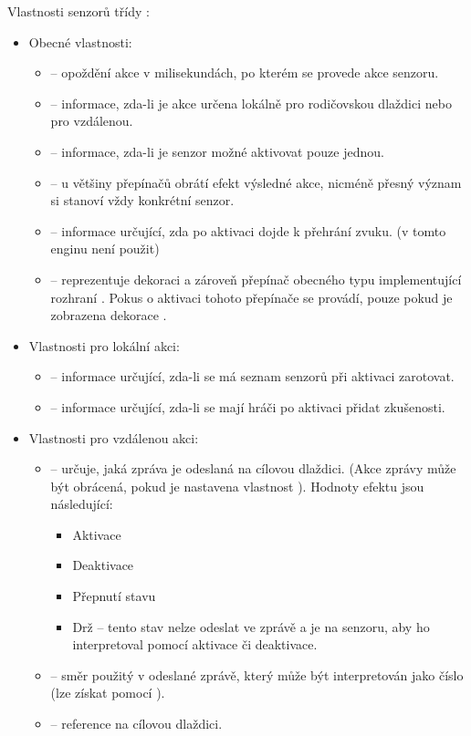 Vlastnosti senzorů třídy :
\begin{itemize}
\item Obecné vlastnosti:
	\begin{itemize}
	\item {} -- opoždění akce v milisekundách, po kterém se provede akce senzoru.
	\item {} -- informace, zda-li je akce určena lokálně pro rodičovskou dlaždici nebo pro vzdálenou.
	\item {} -- informace, zda-li je senzor možné aktivovat pouze jednou.
	\item {} -- u většiny přepínačů obrátí efekt výsledné akce, nicméně přesný význam si stanoví vždy konkrétní senzor. 
	\item {} -- informace určující, zda po aktivaci dojde k přehrání zvuku.  (v tomto enginu není použit)
	\item {} -- reprezentuje dekoraci a zároveň přepínač obecného typu implementující rozhraní .
			Pokus o aktivaci tohoto přepínače se provádí, pouze pokud je zobrazena dekorace .
	\end{itemize}

\item Vlastnosti pro lokální akci:
	\begin{itemize}
	\item {} -- informace určující, zda-li se má seznam senzorů při aktivaci zarotovat.
	\item {} -- informace určující, zda-li se mají hráči po aktivaci přidat zkušenosti.
	\end{itemize}

\item Vlastnosti pro vzdálenou akci:
	\begin{itemize}
	\item {} -- určuje, jaká zpráva je odeslaná na cílovou dlaždici.  (Akce zprávy může být obrácená, pokud je nastavena vlastnost ).
	Hodnoty efektu jsou následující:
		\begin{itemize}
		\item Aktivace 
		\item Deaktivace
		\item Přepnutí stavu
		\item Drž -- tento stav nelze odeslat ve zprávě a je na senzoru, aby ho interpretoval pomocí aktivace či deaktivace.
		\end{itemize}
	\item {} -- směr použitý v odeslané zprávě, který může být interpretován jako číslo (lze získat pomocí ).
	\item {} -- reference na cílovou dlaždici.
	\end{itemize}
\end{itemize}

